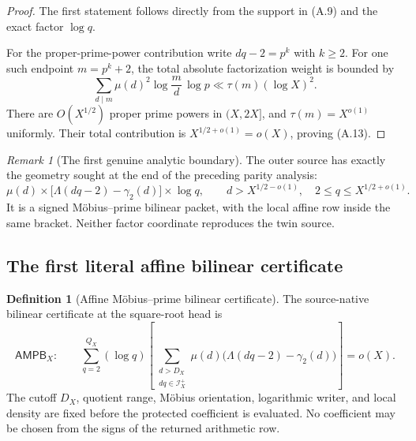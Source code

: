\documentclass[11pt]{article}
\theoremstyle{definition}
\newtheorem{definition}[theorem]{Definition}
\theoremstyle{remark}
\newtheorem{remark}[theorem]{Remark}
\begin{document}
\begin{proof}
The first statement follows directly from the support in \textup{(A.9)} and the exact
factor $\log q$.

For the proper-prime-power contribution write $dq-2=p^k$ with $k\ge2$.
For one such endpoint $m=p^k+2$, the total absolute factorization weight is
bounded by
\[
 \sum_{d\mid m}\mu(d)^2
 \log\frac md\,\log p
 \ll \tau(m)(\log X)^2.
\]
There are $O(X^{1/2})$ proper prime powers in $(X,2X]$, and
$\tau(m)=X^{o(1)}$ uniformly.  Their total contribution is
$X^{1/2+o(1)}=o(X)$, proving \textup{(A.13)}.
\end{proof}

\begin{remark}[The first genuine analytic boundary]
The outer source has exactly the geometry sought at the end of the preceding parity analysis:
\[
 \boxed{
 \mu(d)
 \times
 \bigl[\Lambda(dq-2)-\gamma_2(d)\bigr]
 \times
 \log q,
 \qquad
 d>X^{1/2-o(1)},
 \quad
 2\le q\le X^{1/2+o(1)}.}
\]
It is a signed M\"obius--prime bilinear packet, with the local affine row
inside the same bracket.  Neither factor coordinate reproduces the twin
source.
\end{remark}

\subsection{The first literal affine bilinear certificate}
\label{subsec:affouter-bilinear-certificate}

\begin{definition}[Affine M\"obius--prime bilinear certificate]
\label{def:affouter-bilinear-certificate}
The source-native bilinear certificate at the square-root head is
\begin{equation}
 \label{eq:affouter-bilinear-certificate}
 \boxed{
 \mathsf{AMPB}_X:
 \qquad
 \sum_{q=2}^{Q_X}(\log q)
 \left[
  \sum_{\substack{d>D_X\\dq\in\mathscr I_X^+}}
  \mu(d)
  \bigl(\Lambda(dq-2)-\gamma_2(d)\bigr)
 \right]
 =o(X).}
 \tag{A.14}
\end{equation}
The cutoff $D_X$, quotient range, M\"obius orientation, logarithmic writer,
and local density are fixed before the protected coefficient is evaluated.
No coefficient may be chosen from the signs of the returned arithmetic row.
\end{definition}
\end{document}
